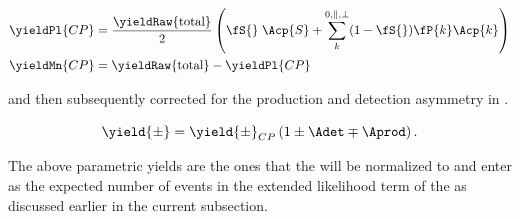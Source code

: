 \begin{align}
\yieldPl{CP} &= \frac{ \yieldRaw{\text{total}} }{2} \left( \fS{}\; \Acp{S} + \sum_k^{0,\parallel,\perp} (1-\fS{})\fP{k}\Acp{k}  \right) \nonumber \\
\yieldMn{CP} &=  \yieldRaw{\text{total}} - \yieldPl{CP}
\label{acp_yields}
\end{align}

\noindent and then subsequently corrected for the production and detection asymmetry in .

\begin{equation}
\yield{\pm} = \yield{\pm}_{CP}  \left( 1 \pm \Adet \mp \Aprod \right).
\label{norm_yields}
\end{equation}

\noindent The above parametric yields are the ones that the \pdfs will be normalized to and enter as the expected number of events in the extended
likelihood term of the \pdfs as discussed earlier in the current subsection.
